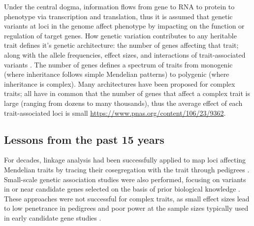 \begin{outline}
\1 Under the central dogma, information flows from gene to RNA to protein to phenotype via transcription and translation, 
thus it is assumed that genetic variants at loci in the genome affect phenotype by impacting on the function or regulation of target genes.
How genetic variation contributes to any heritable trait defines it's genetic architecture: the number of genes affecting that trait; along with the allele frequencies, effect sizes, and interactions of trait-associated variants \autocite{visscher2019Fisher1918Paper}.
The number of genes defines a spectrum of traits from monogenic (where inheritance follows simple Mendelian patterns) to polygenic (where inheritance is complex).
Many architectures have been proposed for complex traits; all have in common that the number of genes that affect a complex trait is large (ranging from dozens to many thousands),
thus the average effect of each trait-associated loci is small \autocite{gibson2011RareCommonVariants,boyle2017ExpandedViewComplex} \url{https://www.pnas.org/content/106/23/9362}.

\subsection{Lessons from the past 15 years}

\1 For decades, linkage analysis had been successfully applied to map loci affecting Mendelian traits by tracing their cosegregation with the trait through pedigrees \autocite{visscher2012FiveYearsGWAS}.
Small-scale genetic association studies were also performed, focusing on variants in or near candidate genes selected on the basis of prior biological knowledge \autocite{hirschhorn2002ComprehensiveReviewGenetic}.
These approaches were not successful for complex traits, as small effect sizes lead to low penetrance in pedigrees \autocite{visscher2012FiveYearsGWAS}
and poor power at the sample sizes typically used in early candidate gene studies \autocite{border2019NoSupportHistorical}.


\end{outline}
